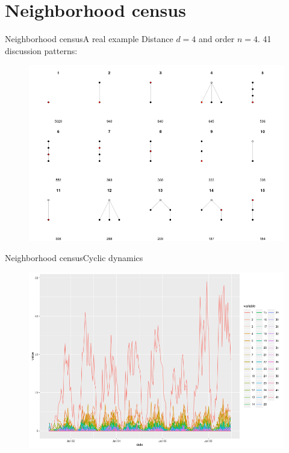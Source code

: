 \documentclass{beamer}
\begin{document}
\section{Neighborhood census}
\begin{frame}{Neighborhood census}{A real example}
Distance $d=4$ and order $n=4$. 41 discussion patterns:

\begin{figure}
	\centering
	\includegraphics[width=1\textwidth]{motifs1}	
\end{figure}	
	
\end{frame}


\begin{frame}{Neighborhood census}{Cyclic dynamics}

\begin{figure}
	\centering
	\includegraphics[width=1\textwidth]{motifs_by_hour}	
\end{figure}
\end{frame}
\end{document}
